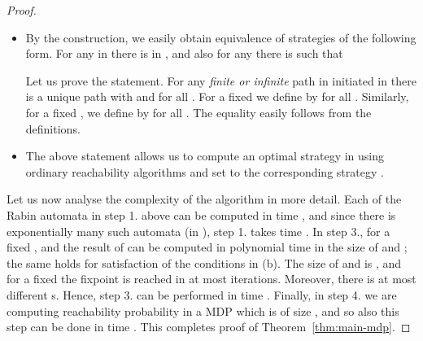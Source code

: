 \documentclass[a4paper,UKenglish]{lipics}
\begin{document}
\begin{proof}
\begin{enumerate}
\begin{itemize}
			\item By the construction, we easily obtain equivalence of strategies of the following form.
For any  in  there is  in , and also for any  there is  such that 
			
Let us prove the statement. For any \emph{finite or infinite} path  in  initiated in 
			there is a unique path  with  and  for all . 
For a fixed  we define  by  for all .
			Similarly, for a fixed , we define  by  for all .
The equality easily follows from the definitions.
			
			\item The above statement allows us to compute an optimal strategy  in  using ordinary reachability algorithms and set  to the corresponding strategy .
		\end{itemize}
\end{enumerate}
	
	\noindent
	
	Let us now analyse the complexity of the algorithm in more detail. Each of the Rabin automata in step 1. above can be computed in time ,
	and since there is exponentially many such automata (in ), step 1. takes time .
	In step 3., for a fixed ,  and  the result of  can be computed in polynomial time in the size of  and ; the same holds 	for satisfaction of the conditions in (b).
The size of  and
	 is
	, and for a fixed  the fixpoint is reached in at most  iterations.
	Moreover, there is
	at most  different s. Hence, step 3. can be performed in time .
	Finally, in step 4. we are computing reachability probability in a MDP  which is of size ,
	and so also this step can be done in time .
	This completes proof of Theorem~\ref{thm:main-mdp}.
\end{proof}
 
\end{document}
